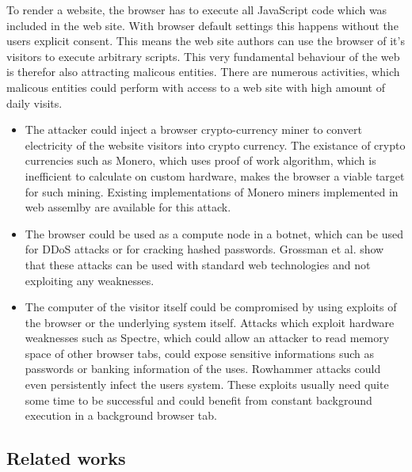\documentclass[article,type=bsc,colorback,accentcolor=tud9c]{tudthesis}
\begin{document}
  To render a website, the browser has to execute all JavaScript code which was included in the web site. With browser default settings this happens without the users explicit consent. This means the web site authors can use the browser of it's visitors to execute arbitrary scripts. This very fundamental behaviour of the web is therefor also attracting malicous entities. There are numerous activities, which malicous entities could perform with access to a web site with high amount of daily visits.

  \begin{itemize}
  \item The attacker could inject a browser crypto-currency miner to convert electricity of the website visitors into crypto currency. The existance of crypto currencies such as Monero, which uses proof of work algorithm, which is inefficient to calculate on custom hardware, makes the browser a viable target for such mining. Existing implementations of Monero miners implemented in web assemlby are available for this attack.
  \item The browser could be used as a compute node in a botnet, which can be used for DDoS attacks or for cracking hashed passwords. Grossman et al.\cite{grossmann2013million} show that these attacks can be used with standard web technologies and not exploiting any weaknesses.
  \item The computer of the visitor itself could be compromised by using exploits of the browser or the underlying system itself. Attacks which exploit hardware weaknesses such as Spectre\cite{Kocher2018spectre}, which could allow an attacker to read memory space of other browser tabs, could expose sensitive informations such as passwords or banking information of the uses. Rowhammer\cite{rowhammer} attacks could even persistently infect the users system. These exploits usually need quite some time to be successful and could benefit from constant background execution in a background browser tab.
  \end{itemize}

  

  \subsection{Related works}
\end{document}

